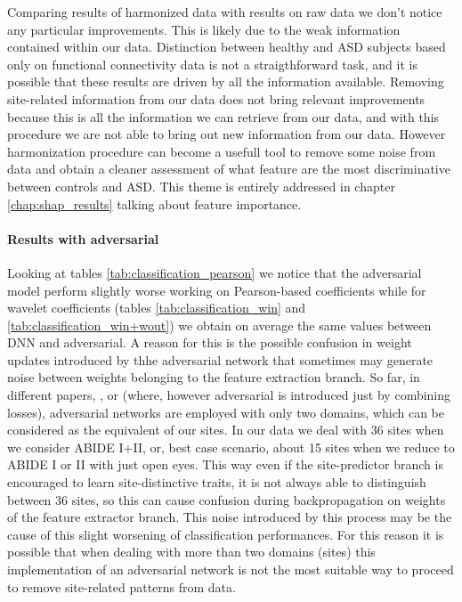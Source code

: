 \documentclass[11pt]{report}
\begin{document}
\hfill

Comparing results of harmonized data with results on raw data we don't notice any particular improvements. This is likely due to the weak information contained within our data. Distinction between healthy and ASD subjects based only on functional connectivity data is not a straigthforward task, and it is possible that these results are driven by all the information available. Removing site-related information from our data does not bring relevant improvements because this is all the information we can retrieve from our data, and with this procedure we are not able to bring out new information from our data.
However harmonization procedure can become a usefull tool to remove some noise from data and obtain a cleaner assessment of what feature are the most discriminative between controls and ASD. This theme is entirely addressed in chapter \ref{chap:shap_results} talking about feature importance.


\paragraph{Results with adversarial}
Looking at tables \ref{tab:classification_pearson} we notice that the adversarial model perform slightly worse working on Pearson-based coefficients while for wavelet coefficients (tables \ref{tab:classification_win} and \ref{tab:classification_win+wout}) we obtain on average the same values between DNN and adversarial.
A reason for this is the possible confusion in weight updates introduced by thhe adversarial network that sometimes may generate noise between weights belonging to the feature extraction branch. So far, in different papers, \cite{ganin2016}, \cite{kamath2019} or \cite{guan2021} (where, however adversarial is introduced just by combining losses), adversarial networks are employed with only two domains, which can be considered as the equivalent of our sites. In our data we deal with 36 sites when we consider ABIDE I+II, or, best case scenario, about 15 sites when we reduce to ABIDE I or II with just open eyes.
This way even if the site-predictor branch is encouraged to learn site-distinctive traits, it is not always able to distinguish between 36 sites, so this can cause confusion during backpropagation on weights of the feature extractor branch. This noise introduced by this process may be the cause of this slight worsening of classification performances.
For this reason it is possible that when dealing with more than two domains (sites) this implementation of an adversarial network is not the most suitable way to proceed to remove site-related patterns from data.
\end{document}
